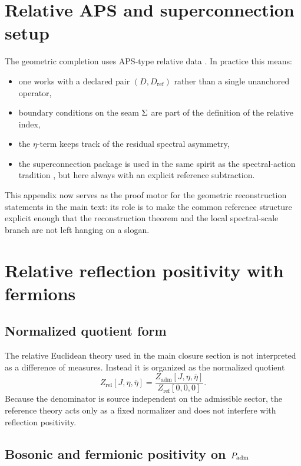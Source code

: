 \section{Relative APS and superconnection setup}
\label{app:aps}

The geometric completion uses APS-type relative data \cite{aps1975}. In practice this means:
\begin{itemize}[leftmargin=1.5em, topsep=3pt, itemsep=2pt]
    \item one works with a declared pair $(D,D_{\mathrm{ref}})$ rather than a single unanchored operator,
    \item boundary conditions on the seam $\Sigma$ are part of the definition of the relative index,
    \item the $\eta$-term keeps track of the residual spectral asymmetry,
    \item the superconnection package is used in the same spirit as the spectral-action tradition \cite{chamseddineConnes1997}, but here always with an explicit reference subtraction.
\end{itemize}

This appendix now serves as the proof motor for the geometric reconstruction statements in the main text: its role is to make the common reference structure explicit enough that the reconstruction theorem and the local spectral-scale branch are not left hanging on a slogan.

\section{Relative reflection positivity with fermions}
\label{app:os-fermions}

\subsection{Normalized quotient form}

The relative Euclidean theory used in the main closure section is not interpreted as a difference of measures. Instead it is organized as the normalized quotient
\[
Z_{\mathrm{rel}}[J,\eta,\bar\eta]
=
\frac{Z_{\mathrm{adm}}[J,\eta,\bar\eta]}{Z_{\mathrm{ref}}[0,0,0]}.
\]
Because the denominator is source independent on the admissible sector, the reference theory acts only as a fixed normalizer and does not interfere with reflection positivity.

\subsection{Bosonic and fermionic positivity on \texorpdfstring{$P_{\mathrm{adm}}$}{Padm}}

